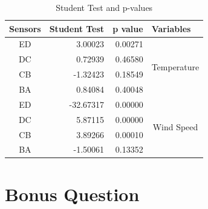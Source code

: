 \documentclass[a4paper,12pt]{article}
\begin{document}
\begin{table}[]
	\centering
	\begin{tabular}{|c|r|r|c|}
		\hline
		\multicolumn{1}{|l|}{Sensors} & \multicolumn{1}{l|}{Student Test} & \multicolumn{1}{l|}{p value} & \multicolumn{1}{l|}{Variables} \\ \hline
		ED                            & 3.00023                           & 0.00271                      & \multirow{4}{*}{Temperature}   \\ \cline{1-3}
		DC                            & 0.72939                           & 0.46580                      &                                \\ \cline{1-3}
		CB                            & -1.32423                          & 0.18549                      &                                \\ \cline{1-3}
		BA                            & 0.84084                           & 0.40048                      &                                \\ \hline
		ED                            & -32.67317                         & 0.00000                      & \multirow{4}{*}{Wind Speed}    \\ \cline{1-3}
		DC                            & 5.87115                           & 0.00000                      &                                \\ \cline{1-3}
		CB                            & 3.89266                           & 0.00010                      &                                \\ \cline{1-3}
		BA                            & -1.50061                          & 0.13352                      &                                \\ \hline
	\end{tabular}
	\caption{Student Test and p-values}
\end{table}
\section{Bonus Question}




\end{document}
